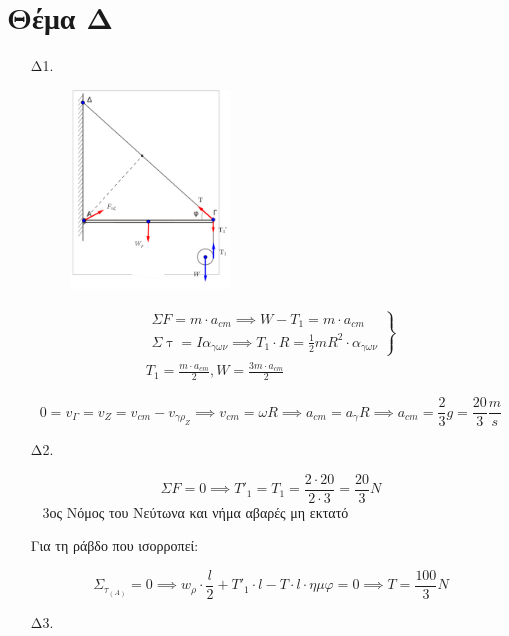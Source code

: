 \documentclass[12pt]{article}
\begin{document}
  \section*{Θέμα Δ}

  \begin{enumerate}
    \item [Δ1.]

    \begin{figure}[h]
      \includegraphics[width=0.4\textwidth]{ΦυσικήΔ1.png}
      \centering
    \end{figure}

    \begin{gather*}
      \left. \begin{matrix}ΣF=m\cdot a_{cm}\implies W-T_1=m\cdot a_{cm} \\ Σ\uptau=Iα_{γων}\implies T_1\cdot R=\frac{1}{2}mR^2\cdot α_{γων}\end{matrix} \right\} \\
      T_1=\frac{m\cdot a_{cm}}{2},W=\frac{3m\cdot a_{cm}}{2}
    \end{gather*}

    $$0=v_Γ=v_Z=v_{cm}-v_{γρ_Ζ}\implies v_{cm}=ωR\implies a_{cm}=a_γ R\implies a_{cm}=\frac{2}{3}g=\frac{20}{3}\frac{m}{s}$$

    \item [Δ2.]

    $$ΣF=0\implies T'_1=T_1=\frac{2\cdot 20}{2\cdot 3}=\frac{20}{3}N$$
  
    3ος Νόμος του Νεύτωνα και νήμα αβαρές μη εκτατό

    Για τη ράβδο που ισορροπεί:

    $$Σ_{τ_{(Α)}}=0\implies w_ρ\cdot\frac{l}{2}+T'_1\cdot l-T\cdot l\cdot ημφ=0\implies T=\frac{100}{3}N$$

    \item [Δ3.]



\end{enumerate}
\end{document}
